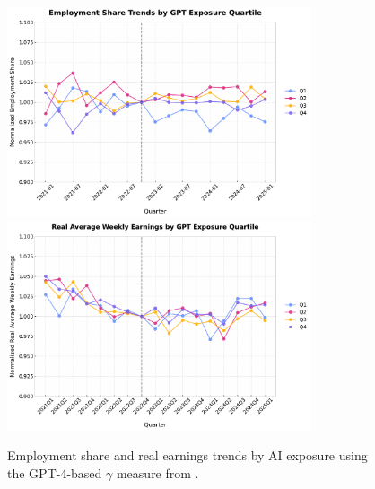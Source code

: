 \documentclass[12pt]{article}
\numberwithin{equation}{section}
\theoremstyle{theorem}\newcustomtheorem{theorem}{{\bf\sc Theorem}}
\theoremstyle{definition}\newcustomtheorem{assumption}{{\bf\sc Assumption}}
\theoremstyle{theorem} \newcustomtheorem{proposition}{{\bf\sc Proposition}}
\begin{document}
\begin{figure}[htbp]
	\centering
  \includegraphics[width=0.8\textwidth]{../figures/employment_share_by_gpt4_gamma_quartile_2021Q1.pdf}
  \includegraphics[width=0.8\textwidth]{../figures/real_earnings_by_gpt4_gamma_quartile_2021Q1.pdf}
	\caption{Employment share and real earnings trends by AI exposure using the GPT-4-based $\gamma$ measure from \citet{eloundou_gpts_2023}.}
	\label{fig:employment_trends_gamma}
\end{figure}
\end{document}
